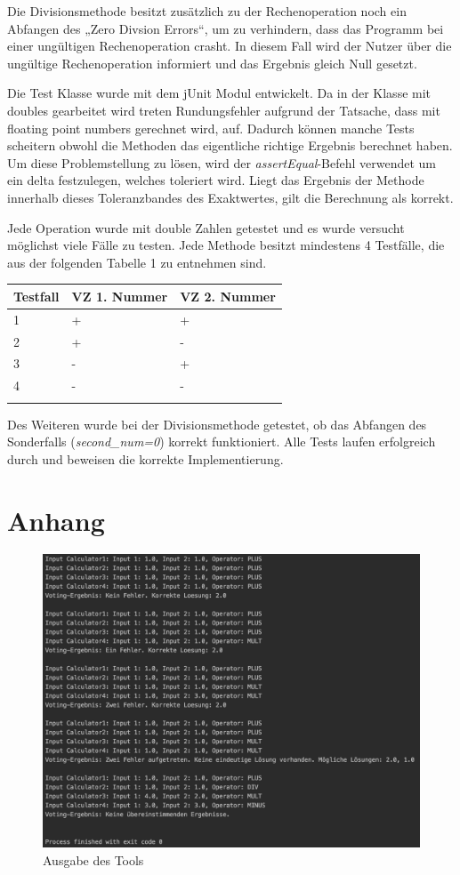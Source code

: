 Die Divisionsmethode besitzt zusätzlich zu der Rechenoperation noch ein Abfangen des „Zero Divsion Errors“, um zu verhindern, dass das Programm bei einer ungültigen Rechenoperation crasht. In diesem Fall wird der Nutzer über die ungültige Rechenoperation informiert und das Ergebnis gleich Null gesetzt.

Die Test Klasse wurde mit dem jUnit Modul entwickelt. Da in der Klasse mit doubles gearbeitet wird treten Rundungsfehler aufgrund der Tatsache, dass mit floating point numbers gerechnet wird, auf. Dadurch können manche Tests scheitern obwohl die Methoden das eigentliche richtige Ergebnis berechnet haben. Um diese Problemstellung zu lösen, wird der \textit{assertEqual}-Befehl verwendet um ein delta festzulegen, welches toleriert wird. Liegt das Ergebnis der Methode innerhalb dieses Toleranzbandes des Exaktwertes, gilt die Berechnung als korrekt.

Jede Operation wurde mit double Zahlen getestet und es wurde versucht möglichst viele Fälle zu testen. Jede Methode besitzt mindestens 4 Testfälle, die aus der folgenden Tabelle 1 zu entnehmen sind.


\begin{tabular}{| l | l | l |}
	\toprule
	Testfall & VZ 1. Nummer & VZ 2. Nummer\\
	\midrule
	1 & + & +\\
	2 & + & -\\
	3 & - & +\\
	4 & - & -\\
	\bottomrule 
\caption{Testfälle}
\end{tabular}

Des Weiteren wurde bei der Divisionsmethode getestet, ob das Abfangen des Sonderfalls (\textit{second_num=0}) korrekt funktioniert. Alle Tests laufen erfolgreich durch und beweisen die korrekte Implementierung.

\chapter{Anhang}
\begin{figure}[H]
\centering
\includegraphics[width=1\textwidth]{images/tool_output.png}
\caption{Ausgabe des Tools}
\end{figure}
